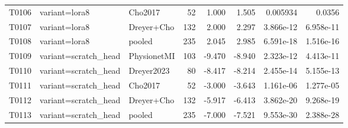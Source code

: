 \begin{longtable}{p{.45in}p{2.6in}p{.75in}rrrrr}
T0106 & variant=lora8 & Cho2017 & 52 & 1.000 & 1.505 & 0.005934 & 0.0356 \\
T0107 & variant=lora8 & Dreyer+Cho & 132 & 2.000 & 2.297 & 3.866e-12 & 6.958e-11 \\
T0108 & variant=lora8 & pooled & 235 & 2.045 & 2.985 & 6.591e-18 & 1.516e-16 \\
T0109 & variant=scratch\_\allowbreak{}head & PhysionetMI & 103 & -9.470 & -8.940 & 2.323e-12 & 4.413e-11 \\
T0110 & variant=scratch\_\allowbreak{}head & Dreyer2023 & 80 & -8.417 & -8.214 & 2.455e-14 & 5.155e-13 \\
T0111 & variant=scratch\_\allowbreak{}head & Cho2017 & 52 & -3.000 & -3.643 & 1.161e-06 & 1.277e-05 \\
T0112 & variant=scratch\_\allowbreak{}head & Dreyer+Cho & 132 & -5.917 & -6.413 & 3.862e-20 & 9.268e-19 \\
T0113 & variant=scratch\_\allowbreak{}head & pooled & 235 & -7.000 & -7.521 & 9.553e-30 & 2.388e-28 \\
\bottomrule
\end{longtable}

